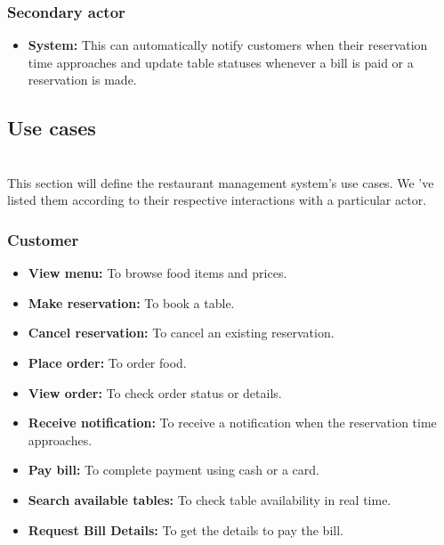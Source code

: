 \subsubsection{Secondary actor}\label{8gO7hU5GmukeTxCBm8M19}

\begin{itemize}
\item
\protect{}\label{Ojbcy61MkxOVo7QBKX8NJ}
\textbf{System:} This can automatically notify customers when their reservation time approaches and update table statuses whenever a bill is paid or a reservation is made.
\end{itemize}

\subsection{Use cases}\label{XzyFtETow34hBYc5yBNZO}
\\
This section will define the restaurant management system's use cases. We 've listed them according to their respective interactions with a particular actor.

\subsubsection{Customer}\label{GPh57H1QxJPPBSjxUI1AT}

\begin{itemize}
\item
\protect{}\label{ThcyiGUcsf9vfdWo9uKl_}
\textbf{View menu:} To browse food items and prices.
\item
\protect{}\label{3SKDMftGkvyxhoqtjqN3U}
\textbf{Make reservation:} To book a table.
\item
\protect{}\label{oElh6x6x6PEeUYpzlj1ww}
\textbf{Cancel reservation:} To cancel an existing reservation.
\item
\protect{}\label{A3PSwFQrcWvSXKqvdLEqS}
\textbf{Place order:} To order food.
\item
\protect{}\label{A1KKAmy3bmNeynLdCoqlY}
\textbf{View order:} To check order status or details.
\item
\protect{}\label{G0u2zEXIVkGiL2rS2wAlz}
\textbf{Receive notification:} To receive a notification when the reservation time approaches.
\item
\protect{}\label{2cqLaRQ2rXTWLTkXX_4F2}
\textbf{Pay bill:} To complete payment using cash or a card.
\item
\protect{}\label{Qt6iuvdptA9ENNh14ioHK}
\textbf{Search available tables:} To check table availability in real time.
\item
\protect{}\label{n4YX-xQZ3A7Oix3e341rw}
\textbf{Request Bill Details:} To get the details to pay the bill.
\end{itemize}

